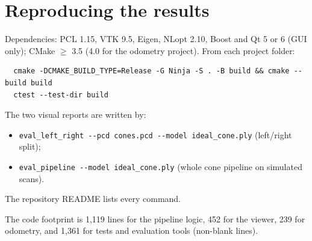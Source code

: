 \documentclass[10pt,a4paper]{scrartcl}
\newcommand{\code}[1]{\texttt{#1}}
\newcommand{\RuleSection}[1]{%
    \section{#1}%
    \vspace{0.2em}{\color{accent!35}\hrule height 0.4pt}\vspace{0.3em}%
  }
\begin{document}
  \RuleSection{Reproducing the results}
  \label{sec:repro}

  Dependencies: PCL 1.15, VTK 9.5, Eigen, NLopt 2.10, Boost and Qt 5 or 6 (GUI only); CMake
  $\ge$ 3.5 (4.0 for the odometry project). From each project folder:
  \begin{verbatim}
  cmake -DCMAKE_BUILD_TYPE=Release -G Ninja -S . -B build && cmake --build build
  ctest --test-dir build
  \end{verbatim}
  The two visual reports are written by:
  \begin{itemize}
    \item \code{eval\_left\_right -{}-pcd cones.pcd -{}-model ideal\_cone.ply} (left/right split);
    \item \code{eval\_pipeline -{}-model ideal\_cone.ply} (whole cone pipeline on simulated scans).
  \end{itemize}
  The repository README lists every command.

  The code footprint is 1,119 lines for the pipeline logic, 452 for the viewer, 239 for
  odometry, and 1,361 for tests and evaluation tools (non-blank lines).

  
  

  
\end{document}
